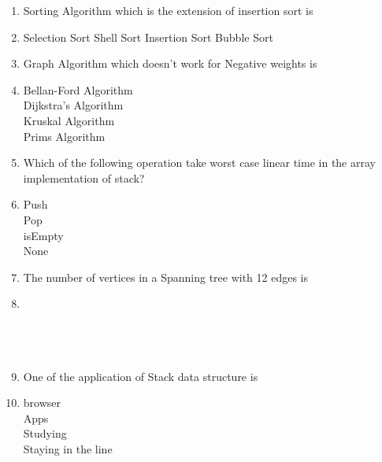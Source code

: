 \documentclass[12pt ,a4paper]{exam}
\begin{document}
\begin{enumerate}[start=1,label={\bfseries Q\arabic*)}]
     \item Sorting Algorithm which is the extension of insertion sort is
     \item[] 
     \begin{oneparchoices}
     	\choice Selection Sort%
     	\choice Shell Sort
     	\choice Insertion Sort
     	\choice Bubble Sort
     \end{oneparchoices}
 
    \item Graph Algorithm which doesn't work for Negative weights is
    \item[] 
    \begin{oneparchoices}
    	\choice Bellan-Ford Algorithm\\%
    	\choice Dijkstra's Algorithm\\
    	\choice Kruskal Algorithm\\
    	\choice Prims Algorithm\\
    \end{oneparchoices}
    
    \item Which of the following operation take worst case linear time in the array implementation of stack?
    \item[] 
    \begin{oneparchoices}
    	\choice Push\\%
    	\choice Pop\\
    	\choice isEmpty\\
    	\choice None\\
    \end{oneparchoices}

    \item The number of vertices in a Spanning tree with 12 edges is 
   \item[] 
   \begin{oneparchoices}
   	\\%
   	\\
   	\\
   	\\
   \end{oneparchoices}
   
    \item One of the application of Stack data structure is
   \item[] 
   \begin{oneparchoices}
   	\choice browser\\%
   	\choice Apps\\
   	\choice Studying\\
   	\choice Staying in the line\\
   \end{oneparchoices}

    \end{enumerate}
	
\end{document}

